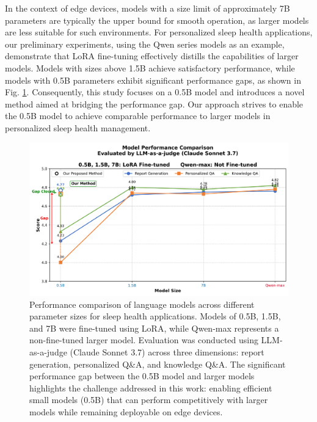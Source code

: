 \documentclass[preprint,12pt]{elsarticle}
\begin{document}
In the context of edge devices, models with a size limit of approximately 7B parameters are typically the upper bound for smooth operation, as larger models are less suitable for such environments. For personalized sleep health applications, our preliminary experiments, using the Qwen series models as an example, demonstrate that LoRA fine-tuning effectively distills the capabilities of larger models. Models with sizes above 1.5B achieve satisfactory performance, while models with 0.5B parameters exhibit significant performance gaps, as shown in Fig. \ref{model_comparison}. Consequently, this study focuses on a 0.5B model and introduces a novel method aimed at bridging the performance gap. Our approach strives to enable the 0.5B model to achieve comparable performance to larger models in personalized sleep health management.
\begin{figure}[h]
\centerline{\includegraphics[width=\columnwidth]{model_comparison_line_improved.png}}
\caption{Performance comparison of language models across different parameter sizes for sleep health applications. Models of 0.5B, 1.5B, and 7B were fine-tuned using LoRA, while Qwen-max represents a non-fine-tuned larger model. Evaluation was conducted using LLM-as-a-judge (Claude Sonnet 3.7) across three dimensions: report generation, personalized Q\&A, and knowledge Q\&A. The significant performance gap between the 0.5B model and larger models highlights the challenge addressed in this work: enabling efficient small models (0.5B) that can perform competitively with larger models while remaining deployable on edge devices.}
\label{model_comparison}
\end{figure}
\end{document}
